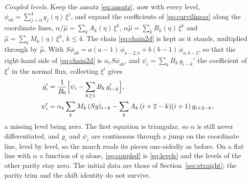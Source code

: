 \documentclass[11pt]{amsart}
\theoremstyle{definition}
\theoremstyle{remark}
\newcommand{\para}[1]{\par\smallskip\noindent\textit{#1}.\enspace}
\begin{document}
\para{Coupled levels}
Keep the ansatz \eqref{eq:ansatz}, now with every level,
$\phi_{ab} = \sum_{j=0}^{4} g_j(\eta)\, \xi^j$, and expand the coefficients
of \eqref{eq:curvilinear} along the coordinate lines,
$\alpha / \hat\mu = \sum_k A_k(\eta)\, \xi^k$,
$\alpha \hat\mu = \sum_k B_k(\eta)\, \xi^k$ and
$\hat\mu = \sum_k M_k(\eta)\, \xi^k$, $k \le 4$. The chain
\eqref{eq:chain2d} is kept as it stands, multiplied through by $\hat\mu$.
With $S \phi_{ab} = a (a - 1)\, \phi_{a-2, b} + b (b - 1)\, \phi_{a, b-2}$,
so that the right-hand side of \eqref{eq:chain2d} is $\alpha_e S \phi_{ab}$,
and $\psi_i = \sum_k B_k\, g_{i-k}'$
the coefficient of $\xi^i$ in the normal flux, collecting $\xi^i$ gives
\begin{equation}
  \label{eq:coupled}
  \begin{aligned}
  g_i' &= \frac{1}{B_0} \Bigl[ \psi_i - \sum_{k \ge 1} B_k\, g_{i-k}'
  \Bigr], \\
  \psi_i' &= \alpha_e \sum_k M_k\, (S g)_{i-k} - \sum_k A_k\, (i + 2 -
  k)(i + 1)\, g_{i+2-k},
  \end{aligned}
\end{equation}
a missing level being zero. The first equation is triangular, so $\alpha$
is still never differentiated, and $g_i$ and $\psi_i$ are continuous
through a jump on the coordinate line, level by level, so the march reads
its pieces one-sidedly as before. On a flat line with $\alpha$ a function
of $\eta$ alone, \eqref{eq:coupled} is \eqref{eq:levels} and the levels of
the other parity stay zero. The initial data are those of
Section~\ref{sec:straight}; the parity trim and the shift identity do not
survive.
\end{document}
